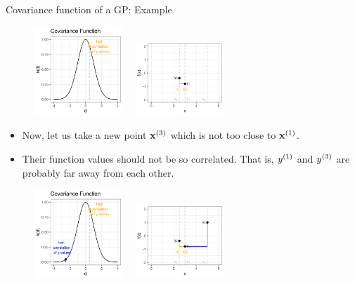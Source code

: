 \begin{frame}[c,allowframebreaks]{Covariance function of a GP: Example}
\begin{figure}
\includegraphics[width=0.3\textwidth]{figure_man/covariance2point/example_covariance_1.png} ~
\includegraphics[width=0.3\textwidth]{figure_man/covariance2point/example_function_1-2.png}
\end{figure}


\framebreak

\begin{itemize}
\item Now, let us take a new point $\mathbf{x}^{(3)}$ which is not too close to $\mathbf{x}^{(1)}$.
  
\vspace{.3cm}
\item Their function values should not be so correlated. That is, $y^{(1)}$ and $y^{(3)}$ are probably far away from each other.
\end{itemize}

\vspace{.3cm}

\begin{figure}
\includegraphics[width=0.3\textwidth]{figure_man/covariance2point/example_covariance_2.png} ~      
\includegraphics[width=0.3\textwidth]{figure_man/covariance2point/example_function_2-1.png}
\end{figure}

\end{frame}
